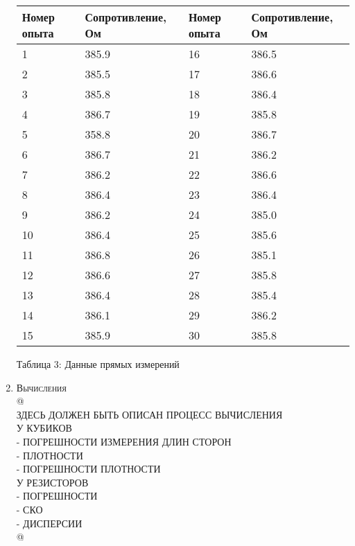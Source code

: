 \documentclass[12pt]{article}
\begin{document}
\begin{enumerate}
\begin{center}
    \begin{tabular}{|l|l|l|l|}
    \hline
        Номер опыта  & Сопротивление, Ом & Номер опыта  & Сопротивление, Ом \\ \hline
        1 & 385.9 & 16 & 386.5 \\ \hline
        2 & 385.5 & 17 & 386.6 \\ \hline
        3 & 385.8 & 18 & 386.4 \\ \hline
        4 & 386.7 & 19 & 385.8 \\ \hline
        5 & 358.8 & 20 & 386.7 \\ \hline
        6 & 386.7 & 21 & 386.2 \\ \hline
        7 & 386.2 & 22 & 386.6 \\ \hline
        8 & 386.4 & 23 & 386.4 \\ \hline
        9 & 386.2 & 24 & 385.0 \\ \hline
        10 & 386.4 & 25 & 385.6 \\ \hline
        11 & 386.8 & 26 & 385.1 \\ \hline
        12 & 386.6 & 27 & 385.8\\ \hline
        13 & 386.4 & 28 & 385.4\\ \hline
        14 & 386.1 & 29 & 386.2\\ \hline
        15 & 385.9 & 30 & 385.8 \\ \hline
    \end{tabular}
\end{center}
    \begin{center}
        Таблица 3: Данные прямых измерений 
       \end{center}

    \item \large\textsc{Вычисления} \\
    @ \\
    ЗДЕСЬ ДОЛЖЕН БЫТЬ ОПИСАН ПРОЦЕСС ВЫЧИСЛЕНИЯ \\
    У КУБИКОВ \\
    - ПОГРЕШНОСТИ ИЗМЕРЕНИЯ ДЛИН СТОРОН \\
    - ПЛОТНОСТИ \\
    - ПОГРЕШНОСТИ ПЛОТНОСТИ \\
    У РЕЗИСТОРОВ \\
    - ПОГРЕШНОСТИ \\
    - СКО \\
    - ДИСПЕРСИИ \\
    @
    

\end{enumerate}
\end{document}
